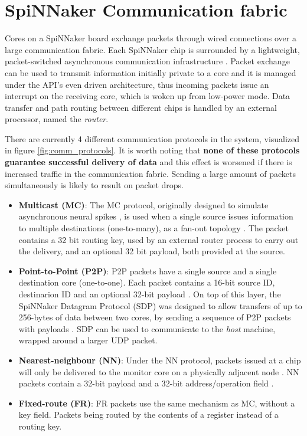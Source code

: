 \section{SpiNNaker Communication fabric}
\label{sec:comm_fabric}

Cores on a SpiNNaker board exchange packets through wired connections over a large communication fabric. Each SpiNNaker chip is surrounded by a lightweight, packet-switched asynchronous communication infrastructure \cite{spinnchip}. Packet exchange can be used to transmit information initially private to a core and it is managed under the API's even driven architecture, thus incoming packets issue an interrupt on the receiving core, which is woken up from low-power mode. Data transfer and path routing between different chips is handled by an external processor, named the \textit{router}.

There are currently 4 different communication protocols in the system, visualized in figure \ref{fig:comm_protocols}. It is worth noting that \textbf{none of these protocols guarantee successful delivery of data} and this effect is worsened if there is increased traffic in the communication fabric. Sending a large amount of packets simultaneously is likely to result on packet drops.

\begin{itemize}
\item \textbf{Multicast (MC)}: The MC protocol, originally designed to simulate asynchronous neural spikes \cite{multicastpaper}, is used when a single source issues information to multiple destinations (one-to-many), as a fan-out topology \cite{overviewspinn}. The packet contains a 32 bit routing key, used by an external router process to carry out the delivery, and an optional 32 bit payload, both provided at the source.

\item \textbf{Point-to-Point (P2P)}: P2P packets have a single source and a single destination core (one-to-one). Each packet contains a 16-bit source ID, destinarion ID and an optional 32-bit payload \cite{datasheet}.
On top of this layer, the SpiNNaker Datagram Protocol (SDP) was designed to allow transfers of up to 256-bytes of data between two cores, by sending a sequence of P2P packets with payloads \cite{sdp}. SDP can be used to communicate to the \textit{host} machine, wrapped around a larger UDP packet.

\item \textbf{Nearest-neighbour (NN)}: Under the NN protocol, packets issued at a chip will only be delivered to the monitor core on a physically adjacent node \cite{overviewspinn}. NN packets contain a 32-bit payload and a 32-bit address/operation field \cite{datasheet}.

\item \textbf{Fixed-route (FR)}: FR packets use the same mechanism as MC, without a key field. Packets being routed by the contents of a register instead of a routing key. 
\end{itemize}

